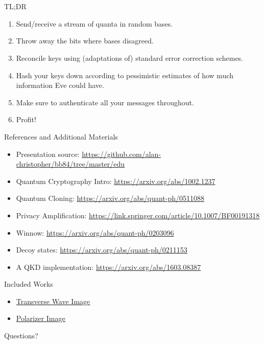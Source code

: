 \documentclass[pdf]{beamer}
\makeatletter
\def\beamer@writeslidentry@miniframesoff{%
  \expandafter\beamer@ifempty\expandafter{\beamer@framestartpage}{}%
  {%
    \clearpage\beamer@notesactions%
  }
}
\newcommand*{\miniframesoff}{\let\beamer@writeslidentry=\beamer@writeslidentry@miniframesoff}
\makeatother
\begin{document}
\miniframesoff
\section*{}
\begin{frame}{TL;DR}
  \begin{enumerate}
  \item Send/receive a stream of quanta in random bases.
  \item Throw away the bits where bases disagreed.
  \item Reconcile keys using (adaptations of) standard error correction schemes.
  \item Hash your keys down according to pessimistic estimates of how much
    information Eve could have.
  \item Make sure to authenticate all your messages throughout.
  \item Profit!
  \end{enumerate}
\end{frame}

\begin{frame}{References and Additional Materials}
  \begin{itemize}
  \item Presentation source:
    \url{https://github.com/alan-christopher/bb84/tree/master/edu}
  \item Quantum Cryptography Intro: \url{https://arxiv.org/abs/1002.1237}
  \item Quantum Cloning: \url{https://arxiv.org/abs/quant-ph/0511088}
  \item Privacy Amplification: \url{https://link.springer.com/article/10.1007/BF00191318}
  \item Winnow: \url{https://arxiv.org/abs/quant-ph/0203096}
  \item Decoy states: \url{https://arxiv.org/abs/quant-ph/0211153} %
  \item A QKD implementation: \url{https://arxiv.org/abs/1603.08387}
  \end{itemize}
\end{frame}

\begin{frame}{Included Works}
  \begin{itemize}
  \item \underline{\href{https://commons.wikimedia.org/wiki/File:EM-Wave.gif}{Transverse Wave Image}}
  \item \underline{\href{https://commons.wikimedia.org/wiki/File:Loi_de_malus.png}{Polarizer Image}}
  \end{itemize}
\end{frame}

\begin{frame}{Questions?}
\end{frame}
\end{document}
